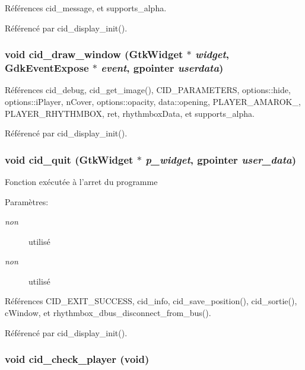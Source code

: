 Références cid\_\-message, et supports\_\-alpha.

Référencé par cid\_\-display\_\-init().
\subsubsection{\setlength{\rightskip}{0pt plus 5cm}void cid\_\-draw\_\-window (GtkWidget $\ast$ {\em widget}, \/  GdkEventExpose $\ast$ {\em event}, \/  gpointer {\em userdata})}\label{cid-gtk_8c_d8ade9f94b2bed188ecf56befae24006}




Références cid\_\-debug, cid\_\-get\_\-image(), CID\_\-PARAMETERS, options::hide, options::iPlayer, nCover, options::opacity, data::opening, PLAYER\_\-AMAROK\_, PLAYER\_\-RHYTHMBOX, ret, rhythmboxData, et supports\_\-alpha.

Référencé par cid\_\-display\_\-init().
\subsubsection{\setlength{\rightskip}{0pt plus 5cm}void cid\_\-quit (GtkWidget $\ast$ {\em p\_\-widget}, \/  gpointer {\em user\_\-data})}\label{cid-gtk_8c_b30f4a7e4964994d4755efee3a97dad6}


Fonction exécutée à l'arret du programme \begin{Desc}
\item[Paramètres:]
\begin{description}
\item[{\em non}]utilisé \item[{\em non}]utilisé \end{description}
\end{Desc}


Références CID\_\-EXIT\_\-SUCCESS, cid\_\-info, cid\_\-save\_\-position(), cid\_\-sortie(), cWindow, et rhythmbox\_\-dbus\_\-disconnect\_\-from\_\-bus().

Référencé par cid\_\-display\_\-init().
\subsubsection{\setlength{\rightskip}{0pt plus 5cm}void cid\_\-check\_\-player (void)}\label{cid-gtk_8c_7d4d00d12c6d69eaeac95729103fb988}




